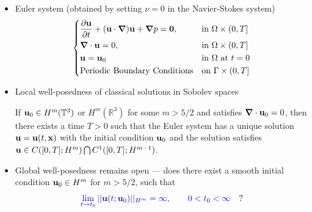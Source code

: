 \documentclass{beamer}
\def\Dpartial#1#2{ {\partial #1 \over \partial #2} }
\def\Bmp#1{ \begin{minipage}{#1} }
\def\Emp{ \end{minipage} }
\def\RR{{\mathbb{R}}}
\def\TT{{\mathbb{T}}}
\def\blue#1{{\color{blue}{ #1 }}}
\def\x{{\bf x}}
\def\u{{\bf u}}
\def\0{{\mathbf{0}}}
\def\bnabla{\boldsymbol{\nabla}}
\begin{document}
\frame
{
\hspace*{-0.8cm}
\Bmp{12cm}
\raggedright

\begin{itemize}
\item<1->
Euler system (obtained by setting $\nu = 0$ in the Navier-Stokes system)
\small
\begin{equation*}
\left\{
\begin{aligned}
&\Dpartial{\u}{t}+({\u}\cdot{\bnabla}){\u}
+{\bnabla}{p}=\0,  && \text{in} \ \Omega\times(0,T] \\ 
&{\bnabla}\cdot{\u}=0,                     && \text{in} \ \Omega\times(0,T] \\ 
&\u = \u_0                 &&  \text{in} \ \Omega \ \text{at} \ t=0 \\
&\textrm{Periodic Boundary Conditions}                  &&  \text{on} \ \Gamma\times(0,T] 
\end{aligned}
\right.
\end{equation*}

\item<3->
Local well-posedness of classical solutions in Sobolev spaces \\ \vspace*{-0.2cm}
\centering \footnotesize
\begin{theorem}[Kato, 1972]
  If $\u_0 \in H^m (\TT^3)$ or $H^m (\RR^3)$ for some $m > 5/2$ and
  satisfies $\bnabla \cdot \u_0 = 0$, then there exists a time $T>0$
  such that the Euler system has a unique solution $\u = \u(t,\x)$ with the initial
  condition $\u_0$ and the solution satisfies $\u \in C([0,
  T]; H^m)\bigcap C^1([0,T]; H^{m-1})$.
\end{theorem}
\smallskip

\item<4->
Global well-posedness remains open --- does there exist a smooth initial condition $\u_0 \in H^m$ for $m>5/2$, such that \\ \vspace*{-0.3cm}
\begin{equation*}
\blue{\lim_{t\to t_0} ||\u(t; \u_0)||_{H^m} = \infty, \qquad 0 < t_0 <
  \infty} \quad ?
\end{equation*}


\end{itemize}

\Emp
}
\end{document}

